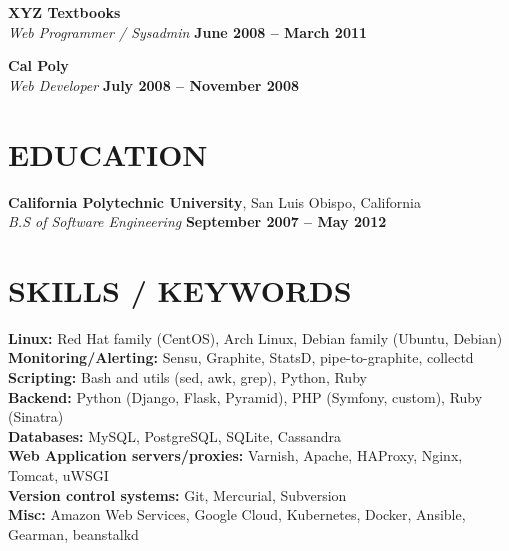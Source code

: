 \documentclass[margin,line]{resume}
\begin{document}
\begin{resume}
    \textbf{\listing XYZ Textbooks} \vspace{2mm}\\\vspace{1mm}%
    \textsl{Web Programmer / Sysadmin} \hfill \textbf{June 2008 -- March 2011}

    \textbf{\listing Cal Poly} \vspace{2mm}\\\vspace{1mm}%
    \textsl{Web Developer} \hfill \textbf{July 2008 -- November 2008}

\sectionline

    \section{\mysidestyle \textbf{\large{E}\small{DUCATION}}}

    \textbf{\listing California Polytechnic University}, San Luis Obispo, California \vspace{1mm}\\
    \textsl{B.S of Software Engineering} \hfill \textbf{September 2007 -- May 2012}\vspace{-3mm}\\\vspace{-1mm}%

\sectionline

    \section{\mysidestyle \textbf{\large{S}\small{KILLS} / \large{K}\small{EYWORDS}}}

    \textbf{Linux:} Red Hat family (CentOS), Arch Linux, Debian family (Ubuntu, Debian)\\
    \textbf{Monitoring/Alerting:} Sensu, Graphite, StatsD, pipe-to-graphite, collectd\\
    \textbf{Scripting:} Bash and utils (sed, awk, grep), Python, Ruby\\
    \textbf{Backend:} Python (Django, Flask, Pyramid), PHP (Symfony, custom), Ruby (Sinatra)\\
    \textbf{Databases:} MySQL, PostgreSQL, SQLite, Cassandra\\
    \textbf{Web Application servers/proxies:} Varnish, Apache, HAProxy, Nginx, Tomcat, uWSGI\\
    \textbf{Version control systems:} Git, Mercurial, Subversion\\
    \textbf{Misc:} Amazon Web Services, Google Cloud, Kubernetes, Docker, Ansible, Gearman, beanstalkd



\end{resume}
\end{document}
